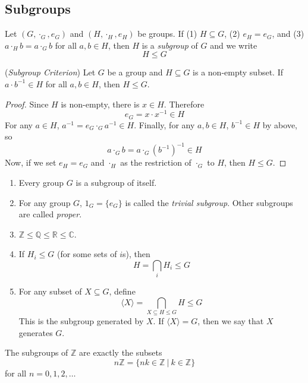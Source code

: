 \documentclass[10pt, a4paper, twoside]{report}
\begin{document}
\subsection{Subgroups}
\begin{definition}
    Let \((G,\cdot_G,e_G)\) and \((H,\cdot_H,e_H)\) be groups. If (1) \(H\subseteq G\), (2) \(e_H=e_G\), and (3) \(a\cdot_H b=a\cdot_G b\) for all \(a,b\in H\), then \(H\) is a \emph{subgroup} of \(G\) and we write
    \[H\leq G\]
\end{definition}
\begin{proposition}
    (\emph{Subgroup Criterion}) Let \(G\) be a group and \(H\subseteq G\) is a non-empty subset. If \(a\cdot b^{-1}\in H\) for all \(a,b\in H\), then \(H\leq G\).
    \begin{proof}
        Since \(H\) is non-empty, there is \(x\in H\). Therefore 
        \[e_G=x\cdot x^{-1}\in H\]
        For any \(a\in H\), \(a^{-1}=e_G\cdot_Ga^{-1}\in H\). Finally, for any \(a,b\in H\), \(b^{-1}\in H\) by above, so 
        \[a\cdot_G b=a\cdot_G(b^{-1})^{-1}\in H\]
        Now, if we set \(e_H=e_G\) and \(\cdot_H\) as the restriction of \(\cdot_G\) to \(H\), then \(H\leq G\).
    \end{proof}
\end{proposition}
\begin{example} \item[] 
    \begin{enumerate}
        \item Every group \(G\) is a subgroup of itself.
        \item For any group \(G\), \(1_G=\{e_G\}\) is called the \emph{trivial subgroup}. Other subgroups are called \emph{proper}.
        \item \(\mathbb{Z}\leq\mathbb{Q}\leq\mathbb{R}\leq\mathbb{C}\).
        \item If \(H_i\leq G\) (for some sets of \(i\)s), then 
        \[H=\bigcap_iH_i\leq G\]
        \item For any subset of \(X\subseteq G\), define 
        \[\langle X\rangle=\bigcap_{X\subseteq H\leq G}H\leq G\]
        This is the subgroup generated by \(X\). If \(\langle X\rangle=G\), then we say that \(X\) generates \(G\).
    \end{enumerate}
\end{example}
\begin{proposition}
    The subgroups of \(\mathbb{Z}\) are exactly the subsets 
    \[n\mathbb{Z}=\{nk\in\mathbb{Z}\:|\:k\in\mathbb{Z}\}\]
    for all \(n=0,1,2,\ldots\)
\end{proposition}
\end{document}
